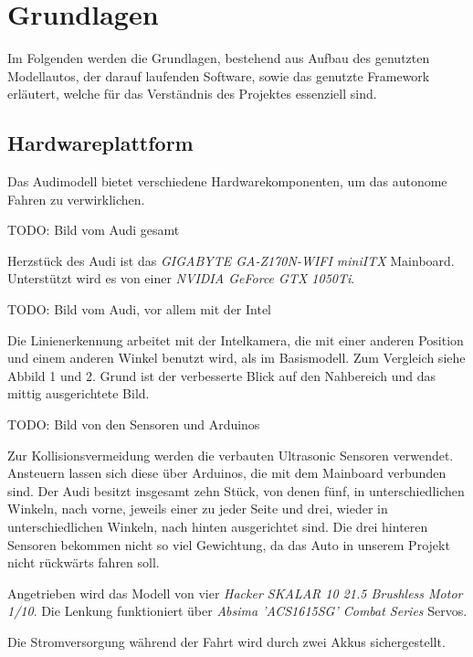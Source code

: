 \documentclass[12pt, a4paper]{scrartcl}
\begin{document}
\section{Grundlagen}

Im Folgenden werden die Grundlagen, bestehend aus Aufbau des genutzten Modellautos, der darauf laufenden Software, sowie das genutzte Framework erläutert, welche für das Verständnis des Projektes essenziell sind.

\subsection{Hardwareplattform}

Das Audimodell bietet verschiedene Hardwarekomponenten, um das autonome Fahren zu verwirklichen.

TODO: Bild vom Audi gesamt

Herzstück des Audi ist das \emph{GIGABYTE GA-Z170N-WIFI miniITX} Mainboard. Unterstützt wird es von einer \emph{NVIDIA GeForce GTX 1050Ti}. 

TODO: Bild vom Audi, vor allem mit der Intel 

Die Linienerkennung arbeitet mit der Intelkamera, die mit einer anderen Position und einem anderen Winkel benutzt wird, als im Basismodell. Zum Vergleich siehe Abbild 1 und 2. Grund ist der verbesserte Blick auf den Nahbereich und das mittig ausgerichtete Bild.

TODO: Bild von den Sensoren und Arduinos

Zur Kollisionsvermeidung werden die verbauten Ultrasonic Sensoren verwendet. Ansteuern lassen sich diese über Arduinos, die mit dem Mainboard verbunden sind. Der Audi besitzt insgesamt zehn Stück, von denen fünf, in unterschiedlichen Winkeln, nach vorne, jeweils einer zu jeder Seite und drei, wieder in unterschiedlichen Winkeln, nach hinten ausgerichtet sind. Die drei hinteren Sensoren bekommen nicht so viel Gewichtung, da das Auto in unserem Projekt nicht rückwärts fahren soll.

Angetrieben wird das Modell von vier \emph{Hacker SKALAR 10 21.5 Brushless Motor 1/10}.
Die Lenkung funktioniert über \emph{Absima 'ACS1615SG' Combat Series} Servos. 

Die Stromversorgung während der Fahrt wird durch zwei Akkus sichergestellt.
\end{document}
